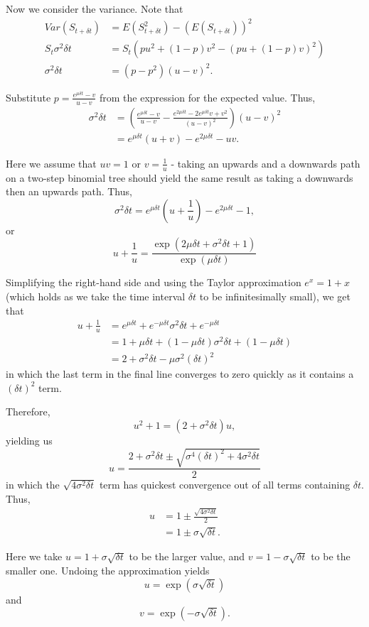 \documentclass[a4paper, 12pt,oneside,openany]{book}
\begin{document}
Now we consider the variance. Note that \begin{align*} Var(S_{t+\delta t}) &= E(S_{t+\delta t}^2) - (E(S_{t+\delta t}))^2 \\ S_t \sigma^2 \delta t&= S_t(pu^2+(1-p)v^2-(pu+(1-p)v)^2) \\ \sigma^2 \delta t&= (p-p^2)(u-v)^2.\end{align*}

Substitute $p=\frac{e^{\mu \delta t}-v}{u-v}$ from the expression for the expected value. Thus, \begin{align*} \sigma^2 \delta t &= \left( \frac{e^{\mu \delta t}-v}{u-v} - \frac{e^{2\mu \delta t}-2e^{\mu \delta t}v+v^2}{(u-v)^2}\right) (u-v)^2 \\ &= e^{\mu \delta t}(u+v)-e^{2\mu \delta t} - uv. \end{align*}

Here we assume that $uv=1$ or $v=\frac{1}{u}$ - taking an upwards and a downwards path on a two-step binomial tree should yield the same result as taking a downwards then an upwards path. Thus, $$\sigma^2 \delta t = e^{\mu \delta t}(u+\frac{1}{u})-e^{2\mu \delta t} - 1,$$ or $$u+\frac{1}{u} = \frac{\exp({2\mu \delta t}+\sigma^2 \delta t +1)}{\exp({\mu \delta t})}$$

Simplifying the right-hand side and using the Taylor approximation $e^x = 1+x$ (which holds as we take the time interval $\delta t$ to be infinitesimally small), we get that \begin{align*}u+\frac{1}{u} &= e^{\mu\delta t} + e^{-\mu \delta t} \sigma^2 \delta t + e^{-\mu \delta t} \\ &= 1+\mu\delta t+  (1-\mu\delta t) \sigma^2\delta t + (1-\mu\delta t) \\ &= 2+\sigma^2\delta t - \mu\sigma^2 (\delta t)^2 \end{align*} in which the last term in the final line converges to zero quickly as it contains a $(\delta t)^2$ term. 

Therefore, $$u^2+1=(2+\sigma^2 \delta t)u,$$ yielding us $$u = \frac{2+\sigma^2 \delta t \pm \sqrt{\sigma^4 (\delta t)^2 +4\sigma^2 \delta t}}{2}$$ in which the $\sqrt{4\sigma^2 \delta t}$ term has quickest convergence out of all terms containing $\delta t$. Thus, \begin{align*} u &= 1 \pm \frac{\sqrt{4\sigma^2 \delta t}}{2} \\ &= 1 \pm \sigma \sqrt{\delta t}. \end{align*} 

Here we take $u=1+\sigma\sqrt{\delta t}$ to be the larger value, and $v=1-\sigma\sqrt{\delta t}$ to be the smaller one. Undoing the approximation yields $$u=\exp(\sigma \sqrt{\delta t})$$ and $$v=\exp(-\sigma \sqrt{\delta t}).$$ 
\end{document}
